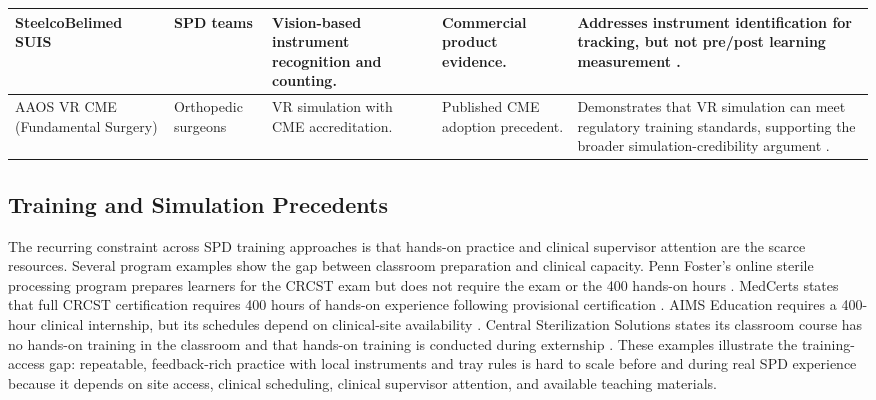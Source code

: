\documentclass[10pt,a4paper]{article}
\begin{document}
\begin{table}[H]
\begin{tabularx}{\textwidth}{|>{\raggedright\arraybackslash}p{2.5cm}|>{\raggedright\arraybackslash}p{2.5cm}|>{\raggedright\arraybackslash}X|>{\raggedright\arraybackslash}p{2cm}|>{\raggedright\arraybackslash}X|}
\hline
SteelcoBelimed SUIS & SPD teams & Vision-based instrument recognition and counting. & Commercial product evidence. & Addresses instrument identification for tracking, but not pre/post learning measurement \cite{steelcobelimed-accessed-2026}. \\
\hline
AAOS VR CME (Fundamental Surgery) & Orthopedic surgeons & VR simulation with CME accreditation. & Published CME adoption precedent. & Demonstrates that VR simulation can meet regulatory training standards, supporting the broader simulation-credibility argument \cite{aaos-fundamental-surgery-2019}. \\
\hline

\end{tabularx}
\end{table}
\subsection{Training and Simulation Precedents}

The recurring constraint across SPD training approaches is that hands-on practice and clinical supervisor attention are the scarce resources. Several program examples show the gap between classroom preparation and clinical capacity. Penn Foster's online sterile processing program prepares learners for the CRCST exam but does not require the exam or the 400 hands-on hours \cite{penn-foster-sterile-processing-accessed-2026}. MedCerts states that full CRCST certification requires 400 hours of hands-on experience following provisional certification \cite{medcerts-catalog-2025}. AIMS Education requires a 400-hour clinical internship, but its schedules depend on clinical-site availability \cite{aims-education-sterile-processing-accessed-2026}. Central Sterilization Solutions states its classroom course has no hands-on training in the classroom and that hands-on training is conducted during externship \cite{central-sterilization-solutions-in-person-accessed-2026}. These examples illustrate the training-access gap: repeatable, feedback-rich practice with local instruments and tray rules is hard to scale before and during real SPD experience because it depends on site access, clinical scheduling, clinical supervisor attention, and available teaching materials.
\end{document}
